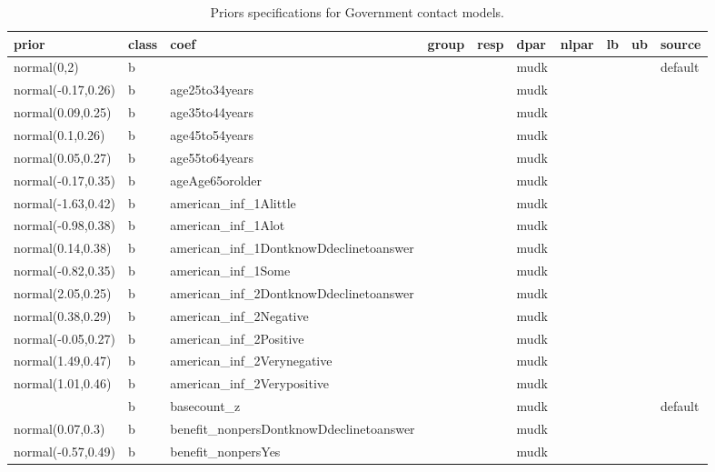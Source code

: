\documentclass[
]{book}
\theoremstyle{definition}
\theoremstyle{definition}
\theoremstyle{definition}
\theoremstyle{definition}
\theoremstyle{remark}
\begin{document}
\begin{table}

\caption{\label{tab:prior-info-crime-gov}Priors specifications for Government contact models.}
\centering
\fontsize{11}{13}\selectfont
\begin{tabular}[t]{l|l|l|l|l|l|l|l|l|l}
\hline
prior & class & coef & group & resp & dpar & nlpar & lb & ub & source\\
\hline
normal(0,2) & b &  &  &  & mudk &  &  &  & default\\
\hline
normal(-0.17,0.26) & b & age25to34years &  &  & mudk &  &  &  & \\
\hline
normal(0.09,0.25) & b & age35to44years &  &  & mudk &  &  &  & \\
\hline
normal(0.1,0.26) & b & age45to54years &  &  & mudk &  &  &  & \\
\hline
normal(0.05,0.27) & b & age55to64years &  &  & mudk &  &  &  & \\
\hline
normal(-0.17,0.35) & b & ageAge65orolder &  &  & mudk &  &  &  & \\
\hline
normal(-1.63,0.42) & b & american\_inf\_1Alittle &  &  & mudk &  &  &  & \\
\hline
normal(-0.98,0.38) & b & american\_inf\_1Alot &  &  & mudk &  &  &  & \\
\hline
normal(0.14,0.38) & b & american\_inf\_1DontknowDdeclinetoanswer &  &  & mudk &  &  &  & \\
\hline
normal(-0.82,0.35) & b & american\_inf\_1Some &  &  & mudk &  &  &  & \\
\hline
normal(2.05,0.25) & b & american\_inf\_2DontknowDdeclinetoanswer &  &  & mudk &  &  &  & \\
\hline
normal(0.38,0.29) & b & american\_inf\_2Negative &  &  & mudk &  &  &  & \\
\hline
normal(-0.05,0.27) & b & american\_inf\_2Positive &  &  & mudk &  &  &  & \\
\hline
normal(1.49,0.47) & b & american\_inf\_2Verynegative &  &  & mudk &  &  &  & \\
\hline
normal(1.01,0.46) & b & american\_inf\_2Verypositive &  &  & mudk &  &  &  & \\
\hline
 & b & basecount\_z &  &  & mudk &  &  &  & default\\
\hline
normal(0.07,0.3) & b & benefit\_nonpersDontknowDdeclinetoanswer &  &  & mudk &  &  &  & \\
\hline
normal(-0.57,0.49) & b & benefit\_nonpersYes &  &  & mudk &  &  &  & \\
\hline

\end{tabular}
\end{table}
\end{document}
